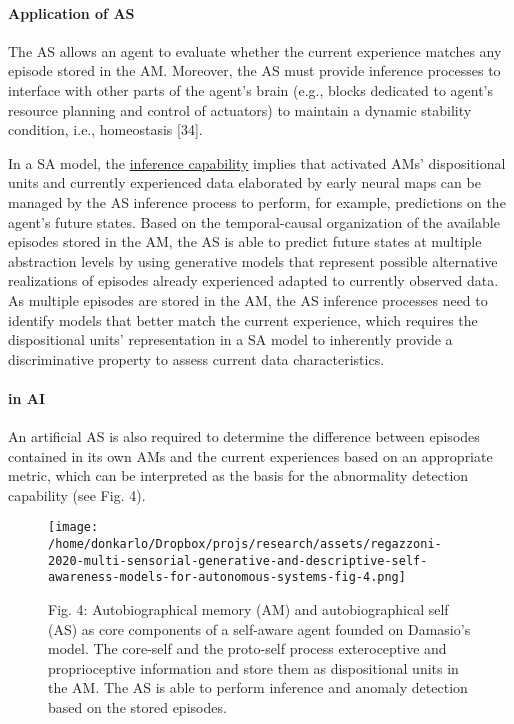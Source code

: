 \documentclass{article}
\begin{document}
			\paragraph{Application of AS}The AS allows an agent to evaluate whether the current experience matches any episode stored in the AM.  Moreover, the AS must provide inference processes to interface with other
			parts of the agent’s brain (e.g., blocks dedicated to agent’s
			resource planning and control of actuators) to maintain a
			dynamic stability condition, i.e., homeostasis \citet{regazzoni-2020-multi-sensorial-generative-and-descriptive-self-awareness-models-for-autonomous-systems}[34]. 
			
			In a SA model, the \underline{inference capability} implies that activated AMs’ dispositional units and currently experienced data elaborated by early neural maps can be managed by the AS inference process to perform, for example, predictions on the agent’s future states. Based on the temporal-causal organization of the available episodes stored in the AM, the AS is able to
			predict future states at multiple abstraction levels by using generative models that represent possible alternative realizations of episodes already experienced adapted to currently observed data. As multiple episodes are stored in the AM, the AS inference processes need to identify models that better match the current experience, which requires the dispositional units’ representation in a SA model to inherently provide a discriminative property to assess current data characteristics.
			
			
			\paragraph{in AI} An artificial AS is also required to determine the difference
			between episodes contained in its own AMs and the current
			experiences based on an appropriate metric, which can be interpreted as the basis for the abnormality detection capability
			(see Fig. 4). 
			\begin{figure*}
				\centering
				\texttt{[image: /home/donkarlo/Dropbox/projs/research/assets/regazzoni-2020-multi-sensorial-generative-and-descriptive-self-awareness-models-for-autonomous-systems-fig-4.png]}
				\caption{Fig. 4: Autobiographical memory (AM) and autobiographical self (AS) as core components of a self-aware agent founded on Damasio’s model. The core-self and the proto-self process exteroceptive and proprioceptive information and store them as dispositional units in the AM. The AS is able to perform inference and anomaly detection based on the stored episodes.
				}
				\label{fig:regazzoni-2020-multi-sensorial-generative-and-descriptive-self-awareness-models-for-autonomous-systems-fig-4.png}
			\end{figure*}
			
\end{document}
